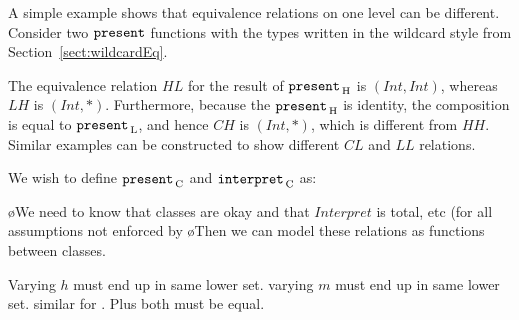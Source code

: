 
A simple example shows that equivalence relations on one level can be different. Consider two ${\tt present}$ functions with the types written in the wildcard style from Section~\ref{sect:wildcardEq}.


The equivalence relation $HL$ for the result of ${\tt present}_{\, \mathrm H}$ is $(Int,Int)$, whereas $LH$ is $(Int, *)$. Furthermore, because the ${\tt present}_{\, \mathrm H}$ is identity, the composition is equal to ${\tt present}_{\, \mathrm L}$, and hence $CH$ is $(Int,*)$, which is different from $HH$. Similar examples can be constructed to show different $CL$ and $LL$ relations.

We wish to define ${\tt present}_{\, \mathrm C}$ and ${\tt interpret}_{\, \mathrm C}$ as:



\toHere
\bl
\o We need to know that classes are okay and that $Interpret$ is total, etc (for all assumptions not enforced by 
\o Then we can model these relations as functions between classes.
\el

Varying $h$ must end up in same lower set. varying $m$ must end up in same lower set.
similar for \interpret. Plus both must be equal.

